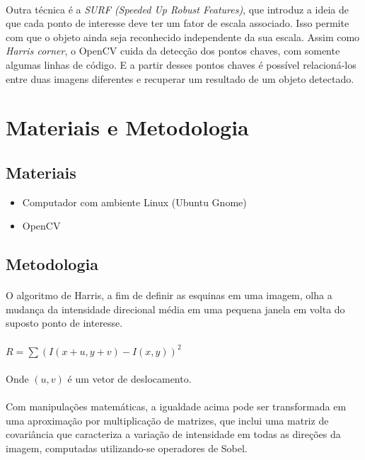 \documentclass[conference, harvard, brazil, english]{sbatex}
\begin{document}
		\paragraph{}
		Outra técnica é a \textit{SURF (Speeded Up Robust Features)}, que introduz a ideia de que cada ponto de interesse deve ter um fator de escala associado. Isso permite com que o objeto ainda seja reconhecido independente da sua escala. Assim como \textit{Harris corner}, o OpenCV cuida da detecção dos pontos chaves, com somente algumas linhas de código. E a partir desses pontos chaves é possível relacioná-los entre duas imagens diferentes e recuperar um resultado de um objeto detectado.
	
	
	\section{Materiais e Metodologia}
		\subsection{Materiais}
			\begin{itemize}
				\item Computador com ambiente Linux (Ubuntu Gnome)
				\item OpenCV
			\end{itemize}
		\subsection{Metodologia}
			\paragraph{}
			O algoritmo de Harris, a fim de definir as esquinas em uma imagem, olha a mudança da intensidade direcional média em uma pequena janela em volta do suposto ponto de interesse.
			\paragraph{}
			\begin{center}
				$ R = \sum (I(x + u, y + v) - I(x,y))^{2} $
			\end{center}
			\paragraph{}
			Onde $ (u, v) $ é um vetor de deslocamento.
			\paragraph{}
			Com manipulações matemáticas, a igualdade acima pode ser transformada em uma aproximação por multiplicação de matrizes, que inclui uma matriz de covariância que caracteriza a variação de intensidade em todas as direções da imagem, computadas utilizando-se operadores de Sobel.
\end{document}
